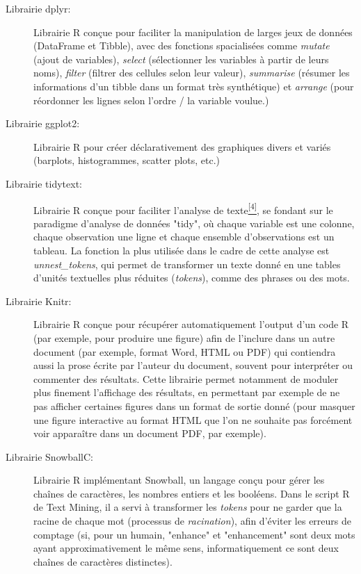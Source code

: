 \documentclass{book}
\begin{document}
  \begin{description}
      \item[Librairie dplyr:] Librairie R conçue pour faciliter la manipulation de larges jeux de données (DataFrame et Tibble), avec des fonctions spacialisées comme \textit{mutate} (ajout de variables), \textit{select} (sélectionner les variables à partir de leurs noms), \textit{filter} (filtrer des cellules selon leur valeur), \textit{summarise} (résumer les informations d'un tibble dans un format très synthétique) et \textit{arrange} (pour réordonner les lignes selon l'ordre / la variable voulue.)
      \item[Librairie ggplot2:] Librairie R pour créer déclarativement des graphiques divers et variés (barplots, histogrammes, scatter plots, etc.)
      \item[Librairie tidytext:] Librairie R conçue pour faciliter l'analyse de texte\hyperref[site3]{\textsuperscript{[4]}}, se fondant sur le paradigme d'analyse de données "tidy", où chaque variable est une colonne, chaque observation une ligne et chaque ensemble d'observations est un tableau. La fonction la plus utilisée dans le cadre de cette analyse est \textit{unnest\_tokens}, qui permet de transformer un texte donné en une tables d'unités textuelles plus réduites (\textit{tokens}), comme des phrases ou des mots.
      \item[Librairie Knitr:] Librairie R conçue pour récupérer automatiquement l'output d'un code R (par exemple, pour produire une figure) afin de l'inclure dans un autre document (par exemple, format Word, HTML ou PDF) qui contiendra aussi la prose écrite par l'auteur du document, souvent pour interpréter ou commenter des résultats. Cette librairie permet notamment de moduler plus finement l'affichage des résultats, en permettant par exemple de ne pas afficher certaines figures dans un format de sortie donné (pour masquer une figure interactive au format HTML que l'on ne souhaite pas forcément voir apparaître dans un document PDF, par exemple).
      \item[Librairie SnowballC:] Librairie R implémentant Snowball, un langage conçu pour gérer les chaînes de caractères, les nombres entiers et les booléens. Dans le script R de Text Mining, il a servi à transformer les \textit{tokens} pour ne garder que la racine de chaque mot (processus de \textit{racination}), afin d'éviter les erreurs de comptage (si, pour un humain, "enhance" et "enhancement" sont deux mots ayant approximativement le même sens, informatiquement ce sont deux chaînes de caractères distinctes).

\end{description}
\end{document}
